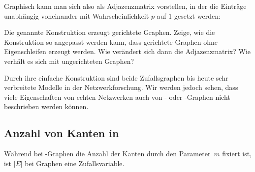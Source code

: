 \noindent
Graphisch kann man sich also \Gnp als Adjazenzmatrix vorstellen, in der die Einträge unabhängig voneinander mit Wahrscheinlichkeit $p$ auf $1$ gesetzt werden:

\begin{center}

\end{center}

\begin{exercise}
    Die genannte Konstruktion erzeugt gerichtete Graphen.
    Zeige, wie die Konstruktion so angepasst werden kann, dass gerichtete Graphen ohne Eigenschleifen erzeugt werden.
    Wie verändert sich dann die Adjazenzmatrix?
    Wie verhält es sich mit ungerichteten Graphen?
\end{exercise}

Durch ihre einfache Konstruktion sind beide Zufallsgraphen bis heute sehr verbreitete Modelle in der Netzwerkforschung.
Wir werden jedoch sehen, dass viele Eigenschaften von echten Netzwerken auch von \Gnp- oder \Gnm-Graphen nicht beschrieben werden können.

\subsection{Anzahl von Kanten in \Gnp}\label{subsec:anzahl_kanten_in_gnp}
Während bei \Gnm-Graphen die Anzahl der Kanten durch den Parameter~$m$ fixiert ist, ist $|E|$ bei \Gnp Graphen eine Zufallsvariable.

